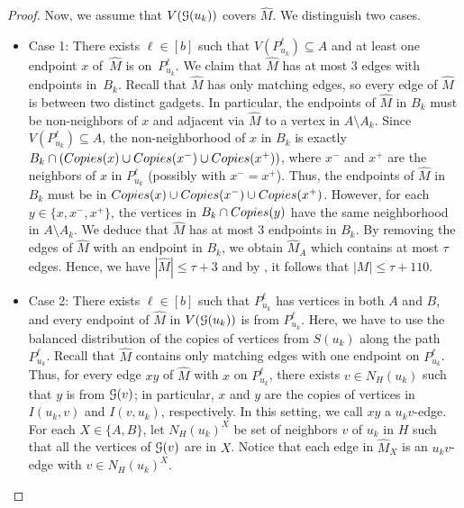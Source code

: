 \documentclass[a4paper,UKenglish,cleveref,hyperref,autoref]{lipics-v2021}
\renewcommand{\leq}{\leqslant}
\begin{document}
\begin{proof}
	Now, we assume that $V(\mathcal G(u_k))$ covers $\widehat M$.
	We distinguish two cases.
	\begin{itemize}
		\item Case 1: There exists $\ell \in [b]$ such that $V(P_{u_k}^\ell) \subseteq A$ and at least one endpoint $x$ of~$\widehat M$ is on~$P_{u_k}^\ell$. 
		We claim that $\widehat M$ has at most 3 edges with endpoints in~$B_k$.
		Recall that $\widehat M$ has only matching edges, so every edge of $\widehat M$ is between two distinct gadgets.
                In particular, the endpoints of $\widehat M$ in $B_k$ must be non-neighbors of $x$ and adjacent via $\widehat M$ to a vertex in $A\setminus A_k$.
		Since $V(P_{u_k}^\ell) \subseteq A$, the non-neighborhood of $x$ in $B_k$ is exactly $B_k \cap (\copies(x) \cup \copies(x^-) \cup \copies(x^+))$, where $x^-$ and $x^+$ are the neighbors of $x$ in $P_{u_k}^\ell$ (possibly with $x^-=x^+$).
		Thus, the endpoints of $\widehat M$ in $B_k$ must be in $\copies(x) \cup \copies(x^-) \cup \copies(x^+)$.
		However, for each $y\in \{x,x^-,x^+\}$, the vertices in $B_k \cap \copies(y)$ have the same neighborhood in $A\setminus A_k$.
		We deduce that $\widehat M$ has at most $3$ endpoints in $B_k$.
		By removing the edges of $\widehat M$ with an endpoint in $B_k$, we obtain $\widehat M_A$ which contains at most $\tau$ edges.
		Hence, we have $|\widehat M| \leq \tau + 3$ and by , it follows that $|M| \leq \tau + 110$.
		
		\item Case 2: There exists $\ell\in [b]$  such that $P_{u_k}^\ell$ has vertices in both $A$ and $B$, and every endpoint of $\widehat M$ in $V(\mathcal G(u_k))$ is from $P_{u_k}^\ell$.
		Here, we have to use the balanced distribution of the copies of vertices from $S(u_k)$ along the path $P_{u_k}^\ell$. 
		Recall that $\widehat M$ contains only matching edges with one endpoint on $P_{u_k}^\ell$. Thus, for every edge $xy$ of $\widehat M$ with $x$ on $P_{u_k}^\ell$, there exists $v\in N_H(u_k)$ such that $y$ is from $\mathcal G(v)$; in particular, $x$ and $y$ are the copies of vertices in $I(u_k,v)$ and $I(v,u_k)$, respectively.
		In this setting, we call $xy$ a $u_kv$-edge. 
		For each $X\in \{A,B\}$, let $N_H(u_k)^X$ be set of neighbors $v$ of $u_k$ in $H$ such that all the vertices of $\mathcal G(v)$ are in $X$.
		Notice that each edge in $\widehat M_X$ is an $u_kv$-edge with $v\in N_H(u_k)^X$.
		

\end{itemize}
\end{proof}
\end{document}

